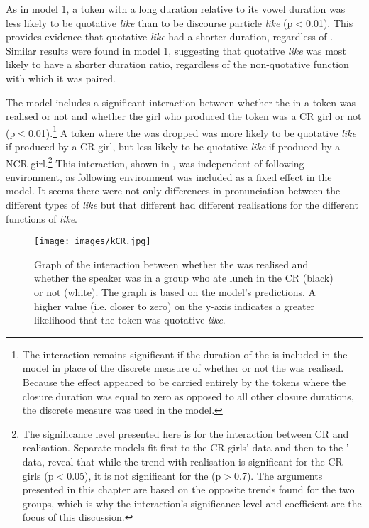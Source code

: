 \largerpage
As in model 1, a token with a long  duration relative to its vowel duration was less likely to be quotative \textit{like} than to be discourse particle \textit{like} (p$<$0.01). This provides evidence that quotative \textit{like} had a shorter  duration, regardless of . Similar results were found in model 1, suggesting that quotative \textit{like} was most likely to have a shorter duration ratio, regardless of the non-quotative function with which it was paired.


The model includes a significant interaction between whether the  in a token was realised or not and whether the girl who produced the token was a CR girl or not (p$<$0.01).\footnote{The interaction remains significant if the duration of the  is included in the model in place of the discrete measure of whether or not the  was realised. Because the effect appeared to be carried entirely by the tokens where the closure duration was equal to zero as opposed to all other closure durations, the discrete measure was used in the model.} A token where the  was dropped was more likely to be quotative \textit{like} if produced by a CR girl, but less likely to be quotative \textit{like} if produced by a NCR girl.\footnote{The significance level presented here is for the interaction between CR and  realisation. Separate models fit first to the CR girls' data and then to the ' data, reveal that while the trend with  realisation is significant for the CR girls (p$<$0.05), it is not significant for the  (p$>$0.7). The arguments presented in this chapter are based on the opposite trends found for the two groups, which is why the interaction's significance level and coefficient are the focus of this discussion.} This interaction, shown in , was independent of following environment, as following environment was included as a fixed effect in the model. It seems there were not only differences in pronunciation between the different types of \textit{like} but that different  had different realisations for the different functions of \textit{like}. 
\begin{figure}[t]
	\centering
		\texttt{[image: images/kCR.jpg]}
	\caption{Graph of the interaction between whether the  was realised and whether the speaker was in a group who ate lunch in the CR (black) or not (white). The graph is based on the model's predictions. A higher value (i.e. closer to zero) on the y-axis indicates a greater likelihood that the token was quotative \textit{like}.}
	\label{fig:kCR-qdp}
\end{figure}





